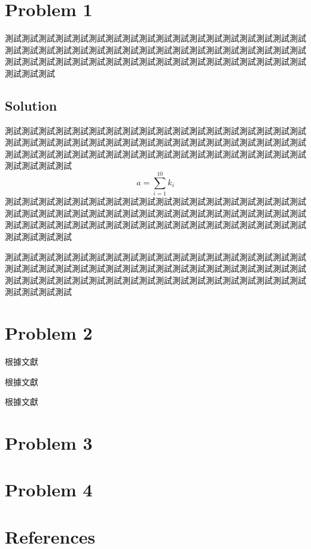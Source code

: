 \documentclass[12pt, a4paper]{article}
\begin{document}
\cfoot{\thepage}


\tableofcontents\thispagestyle{fancy}

\section{Problem 1}

測試測試測試測試測試測試測試測試測試測試測試測試測試測試測試測試測試測試測試測試測試測試測試測試測試測試測試測試測試測試測試測試測試測試測試測試測試測試測試測試測試測試測試測試測試測試測試測試測試測試測試測試測試測試測試測試測試

\subsection*{Solution}
測試測試測試測試測試測試測試測試測試測試測試測試測試測試測試測試測試測試測試測試測試測試測試測試測試測試測試測試測試測試測試測試測試測試測試測試測試測試測試測試測試測試測試測試測試測試測試測試測試測試測試測試測試測試測試測試測試測試
\begin{equation*}
    a = \sum_{i=1}^{10} k_i
\end{equation*}
測試測試測試測試測試測試測試測試測試測試測試測試測試測試測試測試測試測試測試測試測試測試測試測試測試測試測試測試測試測試測試測試測試測試測試測試測試測試測試測試測試測試測試測試測試測試測試測試測試測試測試測試測試測試測試測試測試測試

測試測試測試測試測試測試測試測試測試測試測試測試測試測試測試測試測試測試測試測試測試測試測試測試測試測試測試測試測試測試測試測試測試測試測試測試測試測試測試測試測試測試測試測試測試測試測試測試測試測試測試測試測試測試測試測試測試測試

\clearpage
\section{Problem 2}




根據文獻 \cite{Chen2017b}

根據文獻 \cite{Features2018b}

根據文獻 \cite{Szeliski2010b}

\clearpage
\section{Problem 3}

\clearpage
\section{Problem 4}

\clearpage

\section{References}
\begingroup
    \renewcommand{\section}[2]{}
    
    
\endgroup
\end{document}
